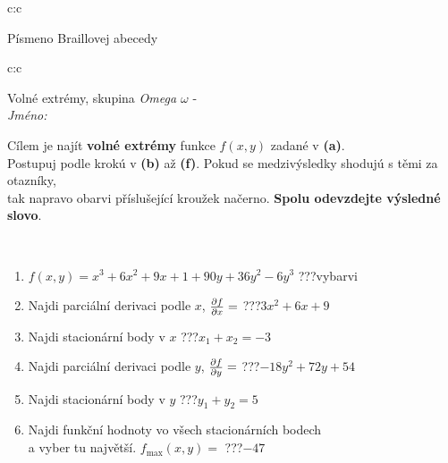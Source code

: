 \documentclass[10pt]{report}
\begin{document}
\begin{tabular}{c:c}
\begin{minipage}[c][104.5mm][t]{0.5\linewidth}
\begin{center}
\begin{minipage}{0.20\linewidth}
\begin{center}
{\small Písmeno Braillovej abecedy}
\end{center}
\end{minipage}
\end{center}
\end{minipage}
%
\end{tabular}
\newpage
\thispagestyle{empty}
\begin{tabular}{c:c}
\begin{minipage}[c][104.5mm][t]{0.5\linewidth}
\begin{center}
\vspace{7mm}
{\huge Volné extrémy, skupina \textit{Omega $\omega$} -}\\[5mm]
\textit{Jméno:}\phantom{xxxxxxxxxxxxxxxxxxxxxxxxxxxxxxxxxxxxxxxxxxxxxxxxxxxxxxxxxxxxxxxxx}\\[5mm]
\begin{minipage}{0.95\linewidth}
\begin{center}
Cílem je najít \textbf{volné extrémy} funkce $f(x,y)$ zadané v \textbf{(a)}.\\Postupuj podle krokú v \textbf{(b)} až \textbf{(f)}. Pokud se medzivýsledky shodujú s těmi za otazníky,\\tak napravo obarvi příslušející kroužek načerno. \textbf{Spolu odevzdejte výsledné slovo}.
\end{center}
\end{minipage}
\\[1mm]
\begin{minipage}{0.79\linewidth}
\begin{center}
\begin{varwidth}{\linewidth}
\begin{enumerate}
\normalsize
\item $f(x,y)=x^3+6x^2+9x+1+90y+36y^2-6y^3$\quad \dotfill\; ???\;\dotfill \quad vybarvi
\item Najdi parciální derivaci podle $x$, $\pdv{f}{x}=$\quad \dotfill\; ???\;\dotfill \quad $3x^2+6x+9$
\item Najdi stacionární body v $x$\quad \dotfill\; ???\;\dotfill \quad $x_1+x_2=-3$
\item Najdi parciální derivaci podle $y$, $\pdv{f}{y}=$\quad \dotfill\; ???\;\dotfill \quad $-18y^2+72y+54$
\item Najdi stacionární body v $y$\quad \dotfill\; ???\;\dotfill \quad $y_1+y_2=5$
\item Najdi funkční hodnoty vo všech stacionárních bodech \\ \phantom{xxxxxx} a vyber tu najvětší. $f_{\text{max}}(x,y)=$\quad \dotfill\; ???\;\dotfill \quad $-47$

\end{enumerate}
\end{varwidth}
\end{center}
\end{minipage}
\end{center}
\end{minipage}
\end{tabular}
\end{document}
